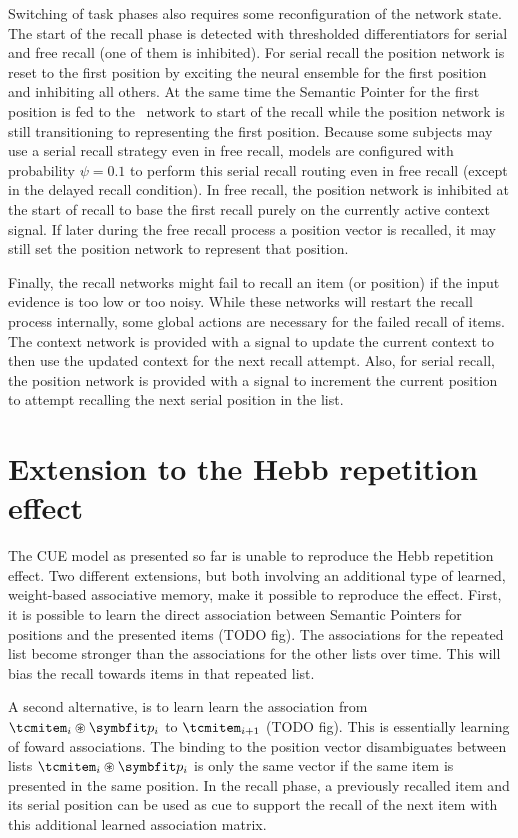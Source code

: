 Switching of task phases also requires some reconfiguration of the network state.
The start of the recall phase is detected with thresholded differentiators for serial and free recall (one of them is inhibited).
For serial recall the position network is reset to the first position by exciting the neural ensemble for the first position and inhibiting all others.
At the same time the Semantic Pointer for the first position is fed to the \mft\ network to start of the recall while the position network is still transitioning to representing the first position.
Because some subjects may use a serial recall strategy even in free recall, models are configured with probability $\psi = 0.1$ to perform this serial recall routing even in free recall (except in the delayed recall condition).
In free recall, the position network is inhibited at the start of recall to base the first recall purely on the currently active context signal.
If later during the free recall process a position vector is recalled, it may still set the position network to represent that position.

Finally, the recall networks might fail to recall an item (or position) if the input evidence is too low or too noisy.
While these networks will restart the recall process internally, some global actions are necessary for the failed recall of items.
The context network is provided with a signal to update the current context to then use the updated context for the next recall attempt.
Also, for serial recall, the position network is provided with a signal to increment the current position to attempt recalling the next serial position in the list.


\section{Extension to the Hebb repetition effect}
The CUE model as presented so far is unable to reproduce the Hebb repetition effect.
Two different extensions, but both involving an additional type of learned, weight-based associative memory, make it possible to reproduce the effect.
First, it is possible to learn the direct association between Semantic Pointers for positions and the presented items (TODO fig).
The associations for the repeated list become stronger than the associations for the other lists over time.
This will bias the recall towards items in that repeated list.

A second alternative, is to learn learn the association from $\tcmitem_i \circledast \vc p_i$ to $\tcmitem_{i+1}$ (TODO fig).
This is essentially learning of foward associations.
The binding to the position vector disambiguates between lists $\tcmitem_i \circledast \vc p_i$ is only the same vector if the same item is presented in the same position.
In the recall phase, a previously recalled item and its serial position can be used as cue to support the recall of the next item with this additional learned association matrix.

